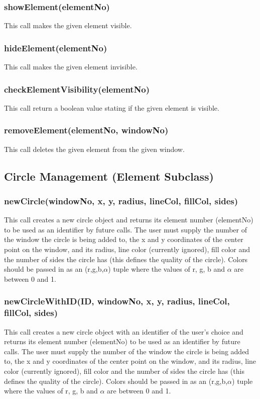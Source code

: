 \documentclass{acm_proc_article-sp}
\begin{document}
\subsubsection{showElement(elementNo)}
This call makes the given element visible.
\subsubsection{hideElement(elementNo)}
This call makes the given element invisible.
\subsubsection{checkElementVisibility(elementNo)}
This call return a boolean value stating if the given element is visible.
\subsubsection{removeElement(elementNo, windowNo)}
This call deletes the given element from the given window.
\subsection{Circle Management (Element Subclass)}
\subsubsection{newCircle(windowNo, x, y, radius, lineCol, fillCol, sides)}
This call creates a new circle object and returns its element number (elementNo) to be used as an identifier by future calls. The user must supply the number of the window the circle is being added to, the x and y coordinates of the center point on the window, and its radius, line color (currently ignored), fill color and the number of sides the circle has (this defines the quality of the circle). Colors should be passed in as an (r,g,b,$\alpha$) tuple where the values of r, g, b and $\alpha$ are between 0 and 1.
\subsubsection{newCircleWithID(ID, windowNo, x, y, radius, lineCol, fillCol, sides)}
This call creates a new circle object with an identifier of the user's choice and returns its element number (elementNo) to be used as an identifier by future calls. The user must supply the number of the window the circle is being added to, the x and y coordinates of the center point on the window, and its radius, line color (currently ignored), fill color and the number of sides the circle has (this defines the quality of the circle). Colors should be passed in as an (r,g,b,$\alpha$) tuple where the values of r, g, b and $\alpha$ are between 0 and 1.
\end{document}
